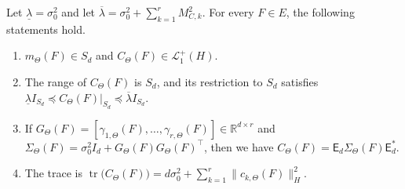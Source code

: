 \begin{proposition}
\label{prop:Admissibility of the covariance operator}
Let \(\underline\lambda=\sigma_0^2\) and let
\(
\overline\lambda
=
\sigma_0^2
+
\sum_{k=1}^rM_{C,k}^2.
\)
For every \(F\in E\), the following statements hold.
\begin{enumerate}
    \item \(m_\Theta(F)\in S_d\) and \(C_\Theta(F)\in\mathcal L_1^+(H)\).

    \item The range of \(C_\Theta(F)\) is \(S_d\), and its restriction to \(S_d\) satisfies
    \(
    \underline\lambda I_{S_d}
    \preceq
    C_\Theta(F)|_{S_d}
    \preceq
    \overline\lambda I_{S_d}.
    \)

    \item If
    \(
    G_\Theta(F)
    =
    [
    \gamma_{1,\Theta}(F)
    ,
    \ldots
    ,
    \gamma_{r,\Theta}(F)
    ]
    \in\mathbb R^{d\times r}
    \)
    and \(\Sigma_\Theta(F)=\sigma_0^2I_d+G_\Theta(F)G_\Theta(F)^\top\), then we have
    \(
    C_\Theta(F)
    =
    \mathsf E_d
    \Sigma_\Theta(F)
    \mathsf E_d^*.
    \)

    \item The trace is
    \(
    \operatorname{tr}\bigl(C_\Theta(F)\bigr)
    =
    d\sigma_0^2
    +
    \sum_{k=1}^r
    \|c_{k,\Theta}(F)\|_H^2.
    \)
\end{enumerate}
\end{proposition}

